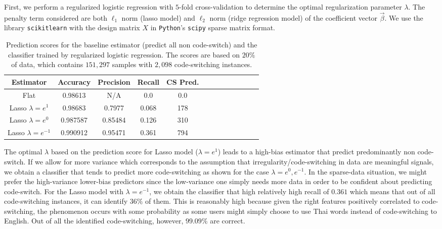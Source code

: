\documentclass[conference]{IEEEtran}
\begin{document}
First, we perform a regularized logistic regression with $5$-fold cross-validation to determine the optimal regularization parameter $\lambda$. The penalty term considered are both $\ell_1$ norm (lasso model) and $\ell_2$ norm (ridge regression model) of the coefficient vector $\vec{\beta}$. We use the library {\tt scikitlearn} with the design matrix $X$ in  {\tt Python}'s {\tt scipy} sparse matrix format.

\begin{table}[h!] 
 \caption{Prediction scores for the baseline estimator (predict all non code-switch) and the classifier trained by regularized logistic regression. The scores are based on $20\%$ of data, which contains $151,297$ samples with  $2,098$ code-switching instances. }
\centering %
\begin{tabular}{c c c c c c rrrrrrr} %
\hline\hline %
Estimator 			&	Accuracy		&	Precision	& 	Recall		&	CS Pred.
\\ [0.5ex] 
\hline 
Flat  						&	 0.98613		& 	 N/A 	&	0.0		& 0.0 	\\ 
Lasso  $\lambda = e^{1}$ 	&	0.98683 		& 	0.7977 	&		0.068		&	178	 \\ 
Lasso  $\lambda = e^{0}$ 	&	 0.987587		& 	0.85484 	&	0.126			&	310	 \\ 
Lasso  $\lambda = e^{-1}$ 	&	 0.990912		& 	0.95471 	&	0.361			&	794	 \\ 
\hline %
\end{tabular} 
\label{tab:scores} 
\end{table} 

The optimal $\lambda$ based on the prediction score for Lasso model ($\lambda = e^1$) leads to a  high-bias estimator that predict predominantly non code-switch. %
If we allow for more variance which corresponds to the assumption that irregularity/code-switching in data are meaningful signals, we obtain a classifier that tends to predict more code-switching as shown for the case $\lambda = e^0, e^{-1}$. %
In the sparse-data situation, we might prefer the high-variance lower-bias predictors since the low-variance one simply needs more data in order to be confident about predicting code-switch. For the Lasso model with $\lambda = e^{-1}$, we obtain the classifier that high relatively high recall of $0.361$ which means that out of all code-switching instances, it can identify $36 \% $ of them. This is reasonably high because given the right features positively correlated to code-switching, the phenomenon occurs with some probability as some users might simply choose to use Thai words instead of code-switching to English. Out of all the identified code-switching, however, $99.09 \% $ are correct. 
\end{document}
